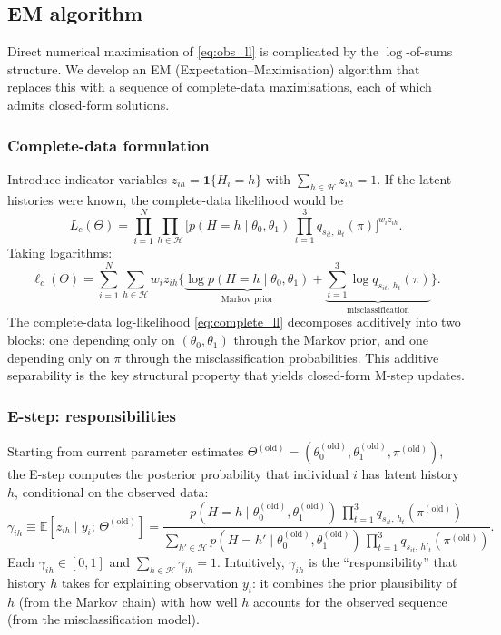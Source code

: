 \subsection{EM algorithm}
\label{sec:em}

Direct numerical maximisation of \eqref{eq:obs_ll} is complicated by the
\(\log\)-of-sums structure. We develop an EM (Expectation--Maximisation)
algorithm that replaces this with a sequence of complete-data
maximisations, each of which admits closed-form solutions.

\subsubsection{Complete-data formulation}

Introduce indicator variables \(z_{ih} = \mathbf{1}\{H_i = h\}\) with
\(\sum_{h \in \mathcal{H}} z_{ih} = 1\). If the latent histories were
known, the complete-data likelihood would be
\[
L_c(\Theta) = \prod_{i=1}^{N} \prod_{h \in \mathcal{H}}
\Big[
  p(H = h \mid \theta_0, \theta_1)\,
  \prod_{t=1}^{3} q_{s_{it},\, h_t}(\pi)
\Big]^{w_i z_{ih}}.
\]
Taking logarithms:
\begin{equation}
\ell_c(\Theta) = \sum_{i=1}^{N} \sum_{h \in \mathcal{H}} w_i z_{ih}
\bigg\{
  \underbrace{\log p(H = h \mid \theta_0, \theta_1)}_{\text{Markov prior}}
  + \underbrace{\sum_{t=1}^{3} \log q_{s_{it},\, h_t}(\pi)}_{\text{misclassification}}
\bigg\}.
\label{eq:complete_ll}
\end{equation}
The complete-data log-likelihood \eqref{eq:complete_ll} decomposes
additively into two blocks: one depending only on
\((\theta_0, \theta_1)\) through the Markov prior, and one depending
only on \(\pi\) through the misclassification probabilities. This
additive separability is the key structural property that yields
closed-form M-step updates.

\subsubsection{E-step: responsibilities}
\label{sec:estep}

Starting from current parameter estimates
\(\Theta^{(\text{old})} = (\theta_0^{(\text{old})}, \theta_1^{(\text{old})}, \pi^{(\text{old})})\),
the E-step computes the posterior probability that individual \(i\) has
latent history \(h\), conditional on the observed data:
\begin{equation}
\gamma_{ih} \equiv \mathbb{E}[z_{ih} \mid y_i;\, \Theta^{(\text{old})}]
= \frac{
  p(H = h \mid \theta_0^{(\text{old})}, \theta_1^{(\text{old})})\,
  \prod_{t=1}^{3} q_{s_{it},\, h_t}(\pi^{(\text{old})})
}{
  \sum_{h' \in \mathcal{H}}
  p(H = h' \mid \theta_0^{(\text{old})}, \theta_1^{(\text{old})})\,
  \prod_{t=1}^{3} q_{s_{it},\, h'_t}(\pi^{(\text{old})})
}.
\label{eq:responsibility}
\end{equation}
Each \(\gamma_{ih} \in [0, 1]\) and
\(\sum_{h \in \mathcal{H}} \gamma_{ih} = 1\). Intuitively,
\(\gamma_{ih}\) is the ``responsibility'' that history \(h\) takes for
explaining observation \(y_i\): it combines the prior plausibility of
\(h\) (from the Markov chain) with how well \(h\) accounts for the
observed sequence (from the misclassification model).

